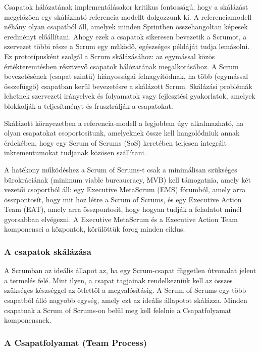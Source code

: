 \documentclass[12pt,a4paper,parskip=full]{scrartcl}
\begin{document}
Csapatok hálózatának implementálásakor kritikus fontosságú, hogy a skálázást megelőzően egy skálázható referencia-modellt dolgozzunk ki. A referenciamodell néhány olyan csapatból áll, amelyek minden Sprintben összehangoltan képesek eredményt előállítani. Ahogy ezek a csapatok sikeresen bevezetik a Scrumot, a szervezet többi része a Scrum egy működő, egészséges példáját tudja lemásolni. Ez prototípusként szolgál a Scrum skálázásához: az egymással közös értékteremtésben résztvevő csapatok hálózatának megalkotásához. A Scrum bevezetésének (csapat szintű) hiányosságai felnagyítódnak, ha több (egymással összefüggő) csapatban kerül bevezetésre a skálázott Scrum. Skálázási problémák lehetnek szervezeti irányelvek és folyamatok vagy fejlesztési gyakorlatok, amelyek blokkolják a teljesítményt és frusztrálják a csapatokat.

Skálázott környezetben a referencia-modell a legjobban úgy alkalmazható, ha olyan csapatokat csoportosítunk, amelyeknek össze kell hangolódniuk annak érdekében, hogy egy Scrum of Scrums (SoS) keretében teljesen integrált inkrementumokat tudjanak közösen szállítani. 

A hatékony működéshez a Scrum of Scrums-t csak a minimálisan szükséges bürokráciának (minimum viable bureaucracy, MVB) kell támogatnia, amely két vezetői csoportból áll: egy Executive MetaScrum (EMS) fórumból, amely arra összpontosít, hogy mit hoz létre a Scrum of Scrums, és egy Executive Action Team (EAT), amely arra összpontosít, hogy hogyan tudják a feladatot minél gyorsabban elvégezni. A Executive MetaScrum és a Executive Action Team komponensei a központok, körülöttük forog minden ciklus.

\subsubsection{A csapatok skálázása}\label{scaling-the-teams}

A Scrumban az ideális állapot az, ha egy Scrum-csapat független útvonalat jelent a termelés felé. Mint ilyen, a csapat tagjainak rendelkezniük kell az összes szükséges készséggel az ötlettől a megvalósításig. A Scrum of Scrums egy több csapatból álló nagyobb egység, amely ezt az ideális állapotot skálázza. Minden csapatnak a Scrum of Scrums-on belül meg kell felelnie a Csapatfolyamat komponensnek.

\subsubsection{A Csapatfolyamat (Team Process)}\label{the-team-process}
\end{document}
